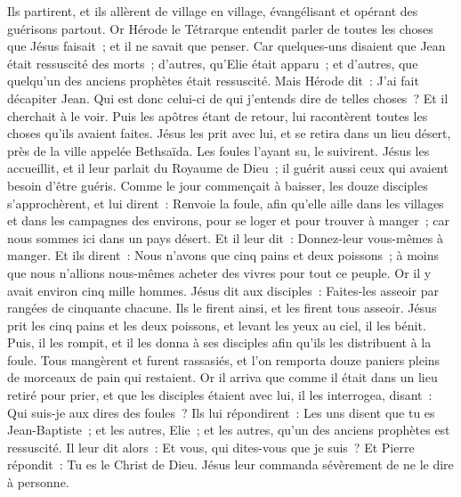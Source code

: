 \begin{multicols}{2}
Ils partirent, et ils allèrent de village en village, évangélisant et opérant des guérisons partout.
Or Hérode le Tétrarque entendit parler de toutes les choses que Jésus faisait~; et il ne savait que penser. Car quelques-uns disaient que Jean était ressuscité des morts~;
d'autres, qu'Elie était apparu~; et d'autres, que quelqu'un des anciens prophètes était ressuscité.
Mais Hérode dit~: J'ai fait décapiter Jean. Qui est donc celui-ci de qui j'entends dire de telles choses~? Et il cherchait à le voir.
Puis les apôtres étant de retour, lui racontèrent toutes les choses qu'ils avaient faites. Jésus les prit avec lui, et se retira dans un lieu désert, près de la ville appelée Bethsaïda.
Les foules l'ayant su, le suivirent. Jésus les accueillit, et il leur parlait du Royaume de Dieu~; il guérit aussi ceux qui avaient besoin d'être guéris.
Comme le jour commençait à baisser, les douze disciples s'approchèrent, et lui dirent~: Renvoie la foule, afin qu'elle aille dans les villages et dans les campagnes des environs, pour se loger et pour trouver à manger~; car nous sommes ici dans un pays désert.
Et il leur dit~: Donnez-leur vous-mêmes à manger. Et ils dirent~: Nous n'avons que cinq pains et deux poissons~; à moins que nous n'allions nous-mêmes acheter des vivres pour tout ce peuple.
Or il y avait environ cinq mille hommes. Jésus dit aux disciples~: Faites-les asseoir par rangées de cinquante chacune.
Ils le firent ainsi, et les firent tous asseoir.
Jésus prit les cinq pains et les deux poissons, et levant les yeux au ciel, il les bénit. Puis, il les rompit, et il les donna à ses disciples afin qu'ils les distribuent à la foule.
Tous mangèrent et furent rassasiés, et l'on remporta douze paniers pleins de morceaux de pain qui restaient.
Or il arriva que comme il était dans un lieu retiré pour prier, et que les disciples étaient avec lui, il les interrogea, disant~: Qui suis-je aux dires des foules~?
Ils lui répondirent~: Les uns disent que tu es Jean-Baptiste~; et les autres, Elie~; et les autres, qu'un des anciens prophètes est ressuscité.
Il leur dit alors~: Et vous, qui dites-vous que je suis~? Et Pierre répondit~: Tu es le Christ de Dieu.
Jésus leur commanda sévèrement de ne le dire à personne.

\end{multicols}

